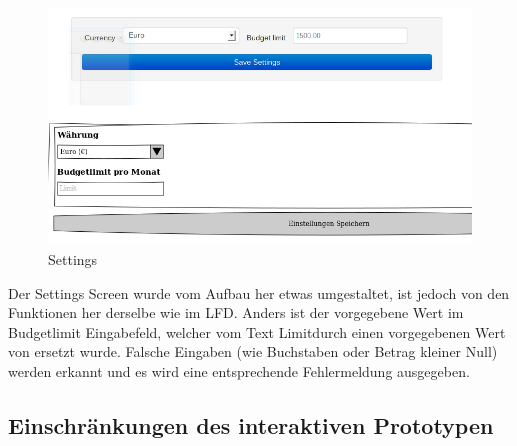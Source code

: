 \documentclass[a4paper,10pt]{article}
\begin{document}
\begin{figure}
\centering
\includegraphics[width=\textwidth]{settings}
\caption{Settings} \label{fig:settings}
\end{figure}

Der Settings Screen wurde vom Aufbau her etwas umgestaltet, ist jedoch von den Funktionen her derselbe wie im LFD. Anders ist 
der vorgegebene Wert im Budgetlimit Eingabefeld, welcher vom Text \glqq
Limit\grqq\space durch einen vorgegebenen Wert von \grqq\space ersetzt
wurde. Falsche Eingaben (wie Buchstaben oder Betrag kleiner Null) werden erkannt und es wird eine entsprechende Fehlermeldung ausgegeben.


\clearpage
\subsection{Einschr\"ankungen des interaktiven Prototypen}

\end{document}

